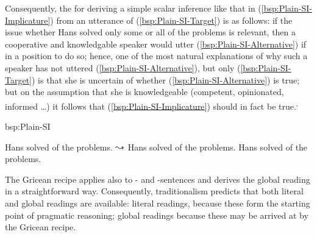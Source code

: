 \documentclass[fleqn,reqno,10pt,draft]{article}
\newcommand{\as}{\acro{as}}
\renewcommand{\es}{\acro{es}}
\begin{document}
Consequently, the 
\citep[c.f.][]{Geurts2010:Quantity-Implic} for deriving a simple
scalar inference like that in (\ref{bsp:Plain-SI-Implicature}) from an
utterance of (\ref{bsp:Plain-SI-Target}) is as follows: if the issue
whether Hans solved only some or all of the problems is relevant, then
a cooperative and knowledgable speaker would utter
(\ref{bsp:Plain-SI-Alternative}) if in a position to do so; hence, one
of the most natural explanations of why such a speaker has not uttered
(\ref{bsp:Plain-SI-Alternative}), but only (\ref{bsp:Plain-SI-Target})
is that she is uncertain of whether (\ref{bsp:Plain-SI-Alternative})
is true; but on the assumption that she is knowledgeable (competent,
opinionated, informed \dots) it follows that
(\ref{bsp:Plain-SI-Implicature}) should in fact be true.\textsuperscript{,}

\begin{exer}{bsp:Plain-SI}
  \ex 
    \begin{xlist}
      \ex \label{bsp:Plain-SI-Target} Hans solved  of the problems.
      \ex \label{bsp:Plain-SI-Implicature} $\leadsto$ Hans solved
         of the problems.
      \ex  \label{bsp:Plain-SI-Alternative}  Hans solved  of the problems.
    \end{xlist}
\end{exer}

The Gricean recipe applies also to \as- and \es-sentences and derives
the global reading in a straightforward way. Consequently,
traditionalism predicts that both literal and global readings are
available: literal readings, because these form the starting point of
pragmatic reasoning; global readings because these may be arrived at
by the Gricean recipe. 
\end{document}
